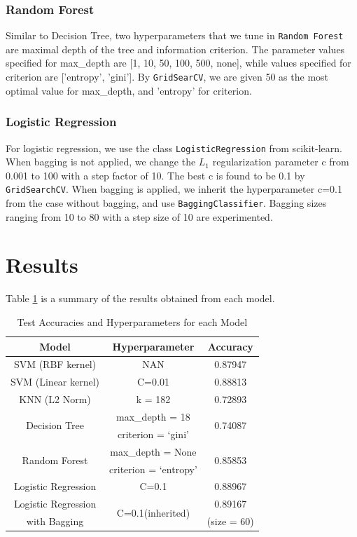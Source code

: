 \documentclass[10pt,twocolumn,letterpaper]{article}
\begin{document}
	\subsubsection{Random Forest}
	Similar to Decision Tree, two hyperparameters that we tune in \texttt{Random Forest} are maximal depth of the tree and information criterion. The parameter values specified for max\_depth are [1, 10, 50, 100, 500, none], while values specified for criterion are ['entropy', 'gini']. By \texttt{GridSearCV}, we are given 50 as the most optimal value for max\_depth, and 'entropy' for criterion. 
	\subsubsection{Logistic Regression}
	For logistic regression, we use the class \texttt{LogisticRegression} from scikit-learn. When bagging is not applied, we change the $L_1$ regularization parameter c from 0.001 to 100 with a step factor of 10. The best c is found to be 0.1 by \texttt{GridSearchCV}. When bagging is applied, we inherit the hyperparameter c=0.1 from the case without bagging, and use \texttt{BaggingClassifier}. Bagging sizes ranging from 10 to 80 with a step size of 10 are experimented.  
	\section{Results}
	Table \ref{results} is a summary of the results obtained from each model. 
	\begin{table}[H]
		\begin{tabular}{|c|c|c|}
			\hline
			Model & Hyperparameter & Accuracy\\
			\hline 
			\hline
			SVM (RBF kernel) & NAN & 0.87947\\
			\hline
			SVM (Linear kernel) & C=0.01 & 0.88813\\
			\hline
			KNN (L2 Norm) & k = 182 & 0.72893\\
			\hline
			\multirow{2}{*}{Decision Tree}  & \small{max\_depth = 18} & \multirow{2}{*}{0.74087}\\
			& \small{criterion = ‘gini’} & \\
			\hline
			\multirow{2}{*}{Random Forest} & \small{max\_depth = None} & \multirow{2}{*}{0.85853}\\
			& \small{criterion = ‘entropy’}& \\
			\hline
			Logistic Regression & C=0.1 & 0.88967\\
			\hline
			Logistic Regression & \multirow{2}{*}{C=0.1(inherited)} & 0.89167 \\
			with Bagging & & (size = 60)\\
			\hline		
		\end{tabular}
		\caption{Test Accuracies and Hyperparameters for each Model}\label{results}
	\end{table}
\end{document}
